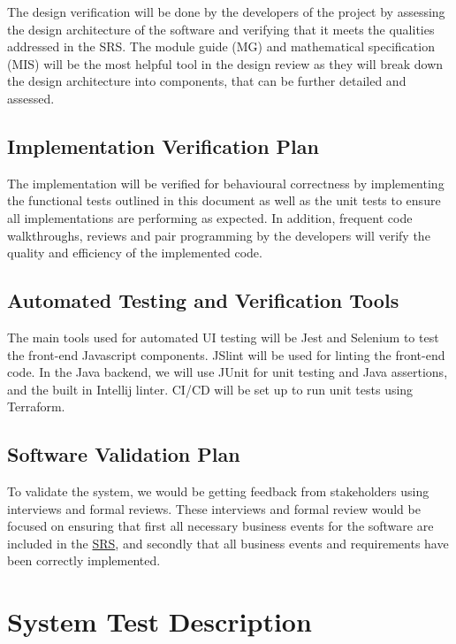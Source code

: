 \documentclass[12pt, titlepage]{article}
\begin{document}
	The design verification will be done by the developers of the project by assessing the design architecture of the software and verifying that it meets the qualities addressed in the SRS. The module guide (MG) and mathematical specification (MIS) will be the most helpful tool in the design review as they will break down the design architecture into components, that can be further detailed and assessed. 
	
	\subsection{Implementation Verification Plan}
	
	The implementation will be verified for behavioural correctness by implementing the functional tests outlined in this document as well as the unit tests to ensure all implementations are performing as expected. In addition, frequent code walkthroughs, reviews and pair programming by the developers will verify the quality and efficiency of the implemented code.
	
	\subsection{Automated Testing and Verification Tools}
	
	The main tools used for automated UI testing will be Jest and Selenium to test the front-end Javascript components. JSlint will be used for linting the front-end code. In the Java backend, we will use JUnit for unit testing and Java assertions, and the built in Intellij linter. CI/CD will be set up to run unit tests using Terraform.
	
	\subsection{Software Validation Plan}
	
	To validate the system, we would be getting feedback from stakeholders using interviews and formal reviews. These interviews and formal review would be focused on ensuring that first all necessary business events for the software are included in the \href{https://github.com/RutheniumVI/UnderTree/blob/main/docs/SRS/SRS.pdf}{SRS}, and secondly that all business events and requirements have been correctly implemented.
	
	\section{System Test Description}
	
\end{document}
